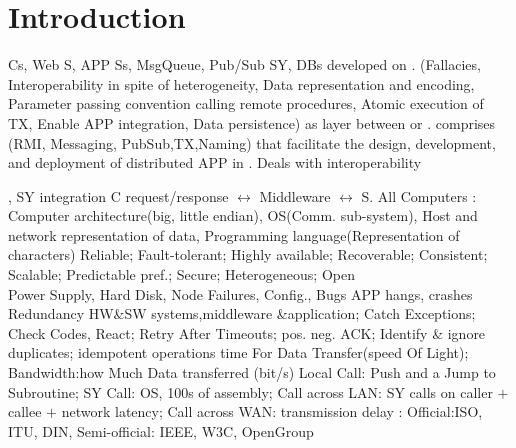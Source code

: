 \section{Introduction}
Cs, Web S, APP Ss, MsgQueue, Pub/Sub SY, DBs 
 developed on .
(Fallacies,
Interoperability in spite of heterogeneity,
Data representation and encoding,
Parameter passing convention calling remote procedures,
Atomic execution of TX,
Enable APP integration,
Data persistence)
 as layer between 
or . 
comprises (RMI, Messaging, PubSub,TX,Naming) that facilitate the
design, development, and deployment of distributed APP in
.
Deals with interoperability
\begin{CJK*}{UTF8}{gbsn}
\end{CJK*}, SY integration
\textbar 
C request/response $\leftrightarrow$ Middleware $\leftrightarrow$ S. 
\textbar
All Computers 
:
Computer architecture(big, little endian), 
OS(Comm. sub-system), 
Host and network representation of data, 
Programming language(Representation of characters)
Reliable; 
Fault-tolerant; 
Highly available; 
Recoverable; 
Consistent; 
Scalable; 
Predictable pref.; 
Secure; 
Heterogeneous; 
Open
\\
Power Supply, Hard Disk, Node Failures, Config., Bugs
APP hangs, crashes 
Redundancy HW\&SW systems,middleware \&application; 
Catch Exceptions; 
Check Codes, React; 
Retry After Timeouts;
pos. neg. ACK; 
Identify \& ignore duplicates; 
idempotent operations
time For Data Transfer(speed Of Light); 
Bandwidth:how Much Data transferred (bit/s)
\textbar
Local Call: Push and a Jump to Subroutine;
SY Call: OS, 100s of assembly;
Call across LAN: SY calls on caller $+$ callee $+$ network latency;
Call across WAN: transmission delay
:
Official:ISO, ITU, DIN, Semi-official: IEEE, W3C, OpenGroup